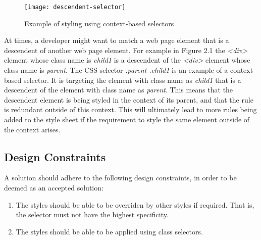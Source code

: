 \documentclass[12pt]{article}
\begin{document}
\begin{figure}[h]
\texttt{[image: descendent-selector]}
\centering
\caption{Example of styling using context-based selectors}
\end{figure}

At times, a developer might want to match a web page element that is a descendent of another web page element. For example in Figure 2.1 the \textit{<div>} element whose class name is \textit{child1} is a descendent of the \textit{<div>} element whose class name is \textit{parent}. The CSS selector \textit{.parent .child1} is an example of a context-based selector. It is targeting the element with class name as \textit{child1} that is a descendent of the element with class name as \textit{parent}. This means that the descendent element is being styled in the context of its parent, and that the rule is redundant outside of this context. This will ultimately lead to more rules being added to the style sheet if the requirement to style the same element outside of the context arises.















\subsection{Design Constraints}
A solution should adhere to the following design constraints, in order to be deemed as an accepted solution:
\begin{enumerate}

	\item The styles should be able to be overriden by other styles if required. That is, the selector must not have the highest specificity.

	\item The styles should be able to be applied using class selectors.

\end{enumerate}
\end{document}
